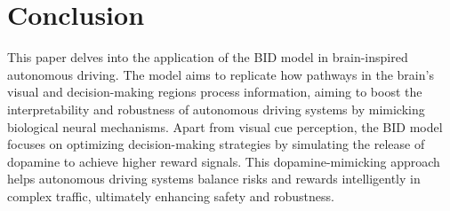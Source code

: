 \section{Conclusion}
\label{sec:conclusion}
\hspace{1pc}This paper delves into the application of the BID model in brain-inspired autonomous driving. The model aims to replicate how pathways in the brain's visual and decision-making regions process information, aiming to boost the interpretability and robustness of autonomous driving systems by mimicking biological neural mechanisms. Apart from visual cue perception, the BID model focuses on optimizing decision-making strategies by simulating the release of dopamine to achieve higher reward signals. This dopamine-mimicking approach helps autonomous driving systems balance risks and rewards intelligently in complex traffic, ultimately enhancing safety and robustness.